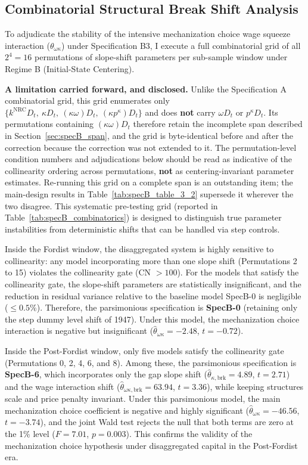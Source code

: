 \documentclass[11pt,a4paper]{article}
\begin{document}
\subsection{Combinatorial Structural Break Shift Analysis}

To adjudicate the stability of the intensive mechanization choice wage squeeze interaction ($\theta_{\omega\kappa}$) under Specification B3, I execute a full combinatorial grid of all $2^4 = 16$ permutations of slope-shift parameters per sub-sample window under Regime B (Initial-State Centering).

\textbf{A limitation carried forward, and disclosed.} Unlike the Specification A combinatorial grid, this grid enumerates only $\{k^{\text{NRC}}D_t,\ \kappa D_t,\ (\kappa\omega)D_t,\ (\kappa p^{\kappa})D_t\}$ and does \textbf{not} carry $\omega D_t$ or $p^{\kappa} D_t$. Its permutations containing $(\kappa\omega)D_t$ therefore retain the incomplete span described in Section~\ref{sec:specB_span}, and the grid is byte-identical before and after the correction because the correction was not extended to it. The permutation-level condition numbers and adjudications below should be read as indicative of the collinearity ordering across permutations, \textbf{not} as centering-invariant parameter estimates. Re-running this grid on a complete span is an outstanding item; the main-design results in Table~\ref{tab:specB_table_3_2} supersede it wherever the two disagree. This systematic pre-testing grid (reported in Table~\ref{tab:specB_combinatorics}) is designed to distinguish true parameter instabilities from deterministic shifts that can be handled via step controls.

Inside the Fordist window, the disaggregated system is highly sensitive to collinearity: any model incorporating more than one slope shift (Permutations 2 to 15) violates the collinearity gate (CN $> 100$). For the models that satisfy the collinearity gate, the slope-shift parameters are statistically insignificant, and the reduction in residual variance relative to the baseline model SpecB-0 is negligible ($\le 0.5\%$). Therefore, the parsimonious specification is \textbf{SpecB-0} (retaining only the step dummy level shift of 1947). Under this model, the mechanization choice interaction is negative but insignificant ($\hat{\theta}_{\omega\kappa} = -2.48$, $t = -0.72$).

Inside the Post-Fordist window, only five models satisfy the collinearity gate (Permutations 0, 2, 4, 6, and 8). Among these, the parsimonious specification is \textbf{SpecB-6}, which incorporates only the gap slope shift ($\hat{\theta}_{\kappa,\text{brk}} = 4.89$, $t = 2.71$) and the wage interaction shift ($\hat{\theta}_{\omega\kappa,\text{brk}} = 63.94$, $t = 3.36$), while keeping structures scale and price penalty invariant. Under this parsimonious model, the main mechanization choice coefficient is negative and highly significant ($\hat{\theta}_{\omega\kappa} = -46.56$, $t = -3.74$), and the joint Wald test rejects the null that both terms are zero at the 1\% level ($F = 7.01$, $p = 0.003$). This confirms the validity of the mechanization choice hypothesis under disaggregated capital in the Post-Fordist era.
\end{document}
